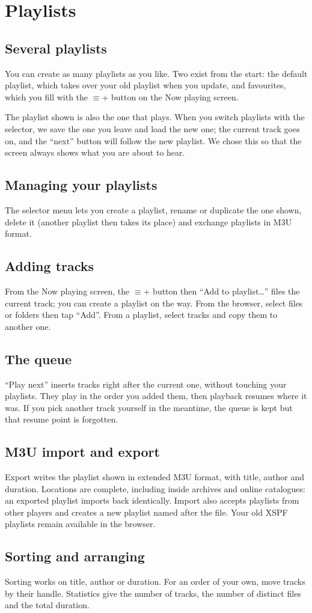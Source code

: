 \chapter{Playlists}\label{chap:listes}

\section{Several playlists}
You can create as many playlists as you like. Two exist from the start: the default playlist, which takes over your
old playlist when you update, and favourites, which you fill with the $\equiv$+ button on the Now playing screen.

The playlist shown is also the one that plays. When you switch playlists with the selector, we save the one you leave
and load the new one; the current track goes on, and the ``next'' button will follow the new playlist. We chose this
so that the screen always shows what you are about to hear.


\section{Managing your playlists}
The selector menu lets you create a playlist, rename or duplicate the one shown, delete it (another playlist then
takes its place) and exchange playlists in M3U format.

\section{Adding tracks}
From the Now playing screen, the $\equiv$+ button then ``Add to playlist\dots'' files the current track; you can
create a playlist on the way. From the browser, select files or folders then tap ``Add''. From a playlist, select
tracks and copy them to another one.

\section{The queue}\label{sec:file}
``Play next'' inserts tracks right after the current one, without touching your playlists. They play in the order you
added them, then playback resumes where it was. If you pick another track yourself in the meantime, the queue is
kept but that resume point is forgotten.

\section{M3U import and export}
Export writes the playlist shown in extended M3U format, with title, author and duration. Locations are complete,
including inside archives and online catalogues: an exported playlist imports back identically. Import also accepts
playlists from other players and creates a new playlist named after the file. Your old XSPF playlists remain
available in the browser.

\section{Sorting and arranging}
Sorting works on title, author or duration. For an order of your own, move tracks by their handle. Statistics give
the number of tracks, the number of distinct files and the total duration.
